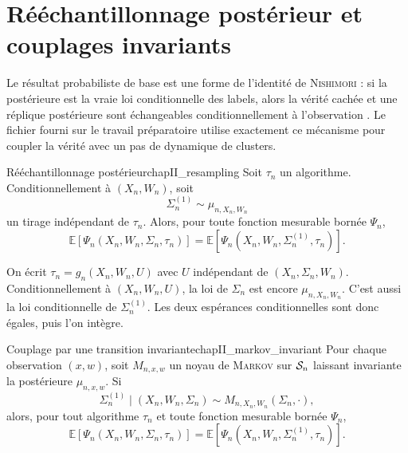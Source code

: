 \section{Rééchantillonnage postérieur et couplages invariants}
\label{sec:chapII_couplage}

Le résultat probabiliste de base est une forme de l'identité de \textsc{Nishimori} : si la postérieure est la vraie loi conditionnelle des labels, alors la vérité cachée et une réplique postérieure sont échangeables conditionnellement à l'observation \cite{Nishimori1980,Nishimori2001}. Le fichier fourni sur le travail préparatoire utilise exactement ce mécanisme pour coupler la vérité avec un pas de dynamique de clusters.

\begin{Theoreme}{Rééchantillonnage postérieur}{chapII_resampling}
Soit $\tau_n$ un algorithme. Conditionnellement à $(X_n,W_n)$, soit
\[
    \Sigma_n^{(1)}\sim\mu_{n,X_n,W_n}
\]
un tirage indépendant de $\tau_n$. Alors, pour toute fonction mesurable bornée $\Psi_n$,
\begin{equation}
    \mathbb E\left[\Psi_n(X_n,W_n,\Sigma_n,\tau_n)\right]
    =
    \mathbb E\left[\Psi_n(X_n,W_n,\Sigma_n^{(1)},\tau_n)\right].
    \label{eq:chapII_resampling}
\end{equation}
\end{Theoreme}

\begin{Preuve}
On écrit $\tau_n=g_n(X_n,W_n,U)$ avec $U$ indépendant de $(X_n,\Sigma_n,W_n)$. Conditionnellement à $(X_n,W_n,U)$, la loi de $\Sigma_n$ est encore $\mu_{n,X_n,W_n}$. C'est aussi la loi conditionnelle de $\Sigma_n^{(1)}$. Les deux espérances conditionnelles sont donc égales, puis l'on intègre.
\end{Preuve}

\begin{Theoreme}{Couplage par une transition invariante}{chapII_markov_invariant}
Pour chaque observation $(x,w)$, soit $M_{n,x,w}$ un noyau de \textsc{Markov} sur $\mathcal S_n$ laissant invariante la postérieure $\mu_{n,x,w}$. Si
\[
    \Sigma_n^{(1)}\mid (X_n,W_n,\Sigma_n)
    \sim
    M_{n,X_n,W_n}(\Sigma_n,\cdot),
\]
alors, pour tout algorithme $\tau_n$ et toute fonction mesurable bornée $\Psi_n$,
\begin{equation}
    \mathbb E\left[\Psi_n(X_n,W_n,\Sigma_n,\tau_n)\right]
    =
    \mathbb E\left[\Psi_n(X_n,W_n,\Sigma_n^{(1)},\tau_n)\right].
    \label{eq:chapII_markov_coupling}
\end{equation}
\end{Theoreme}


